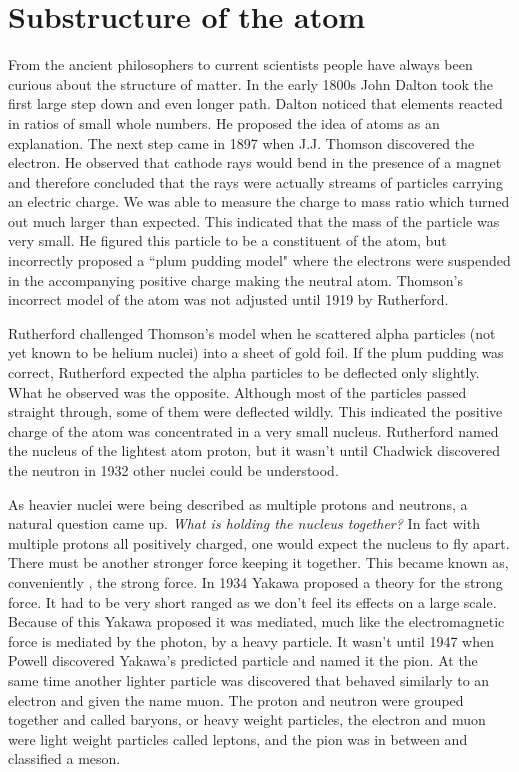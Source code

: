 \documentclass[abstract = on,listof=totoc, bibliography=totoc]{scrreprt}
\begin{document}
\section{Substructure of the atom}

From the ancient philosophers to current scientists people have always been curious about the structure of matter. In the early 1800s John Dalton took the first large step down and even longer path. Dalton noticed that elements reacted in ratios of small whole numbers. He proposed the idea of atoms as an explanation. The next step came in 1897 when J.J. Thomson discovered the electron. He observed that cathode rays would bend in the presence of a magnet and therefore concluded that the rays were actually streams of particles carrying an electric charge. We was able to measure the charge to mass ratio which turned out much larger than expected. This indicated that the mass of the particle was very small. He figured this particle to be a constituent of the atom, but incorrectly proposed a ``plum pudding model" where the electrons were suspended in the accompanying positive charge making the neutral atom. Thomson's incorrect model of the atom was not adjusted until 1919 by Rutherford.

Rutherford challenged Thomson's model when he scattered alpha particles (not yet known to be helium nuclei) into a sheet of gold foil. If the plum pudding was correct, Rutherford expected the alpha particles to be deflected only slightly. What he observed was the opposite. Although most of the particles passed straight through, some of them were deflected wildly. This indicated the positive charge of the atom was concentrated in a very small nucleus. Rutherford named the nucleus of the lightest atom proton, but it wasn't until Chadwick discovered the neutron in 1932 other nuclei could be understood.\cite{IEP}

As heavier nuclei were being described as multiple protons and neutrons, a natural question came up. \textit{What is holding the nucleus together?} In fact with multiple protons all positively charged, one would expect the nucleus to fly apart. There must be another stronger force keeping it together. This became known as, conveniently , the strong force. In 1934 Yakawa proposed a theory for the strong force. It had to be very short ranged as we don't feel its effects on a large scale. Because of this Yakawa proposed it was mediated, much like the electromagnetic force is mediated by the photon, by a heavy particle.  It wasn't until 1947 when Powell discovered Yakawa's predicted particle and named it the pion. At the same time another lighter particle was discovered that behaved similarly to an electron and given the name muon. The proton and neutron were grouped together and called baryons, or heavy weight particles, the electron and muon were light weight particles called leptons, and the pion was in between and classified a meson.\cite{IEP}  
\end{document}
